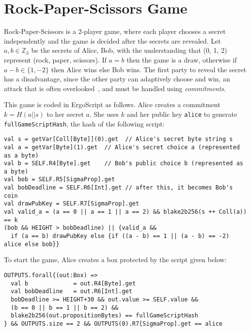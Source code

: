 \documentclass[runningheads]{llncs}
\newcommand{\langname}{ErgoScript\xspace}
\begin{document}
\section{Rock-Paper-Scissors Game}
\label{rps}

Rock-Paper-Scissors is a 2-player game, where each player chooses a secret independently and the game is decided after the secrets are revealed. 
Let $a, b\in \mathbb{Z}_3$ be the secrets of Alice, Bob, with the understanding that (0, 1, 2) represent (rock, paper, scissors). If $a = b$ then the game is a draw, otherwise if $a-b \in \{1, -2\}$ then Alice wins else Bob wins. 
The first party to reveal the secret has a disadvantage, since the other party can adaptively choose and win, an attack that is often overlooked~\cite{rps15}, and must be handled using {\em commitments}. 

This game is coded in \langname as follows.
Alice creates a commitment $k=H(a||s)$ to her secret $a$. She uses $k$ and her public key \texttt{alice} to generate \texttt{fullGameScriptHash}, the hash of the following script:
\small{
\begin{verbatim}
val s = getVar[Coll[Byte]](0).get  // Alice's secret byte string s
val a = getVar[Byte](1).get  // Alice's secret choice a (represented as a byte)
val b = SELF.R4[Byte].get    // Bob's public choice b (represented as a byte)
val bob = SELF.R5[SigmaProp].get
val bobDeadline = SELF.R6[Int].get // after this, it becomes Bob's coin
val drawPubKey = SELF.R7[SigmaProp].get
val valid_a = (a == 0 || a == 1 || a == 2) && blake2b256(s ++ Coll(a)) == k
(bob && HEIGHT > bobDeadline) || {valid_a &&
  if (a == b) drawPubKey else {if ((a - b) == 1 || (a - b) == -2) alice else bob}}
\end{verbatim}
}
To start the game, Alice creates a box protected by the script given below:
\small{
\begin{verbatim}
OUTPUTS.forall{(out:Box) =>
  val b             = out.R4[Byte].get
  val bobDeadline   = out.R6[Int].get
  bobDeadline >= HEIGHT+30 && out.value >= SELF.value &&
  (b == 0 || b == 1 || b == 2) && 
  blake2b256(out.propositionBytes) == fullGameScriptHash
} && OUTPUTS.size == 2 && OUTPUTS(0).R7[SigmaProp].get == alice 
\end{verbatim}
}
\end{document}
